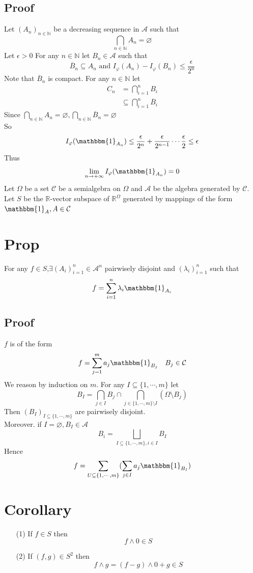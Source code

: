 \documentclass{book}
\begin{document}
\subsection*{Proof}
Let $(A_n)_{n\in \mathbb{N}}$ be a decreasing sequence in $\mathcal{A}$ such that$$\bigcap\limits_{n\in \mathbb{N}}A_n=\varnothing$$
Let $\epsilon>0$ For any $n\in \mathbb{N}$ let $B_n\in \mathcal{A}$ such that $$\overline{B}_n\subseteq A_n\text{ and }I_\varphi(A_n)-I_\varphi(B_n)\leq\frac{\epsilon}{2^n}$$
Note that $\overline{B}_n$ is compact. For any $n\in \mathbb{N}$ let
$$\begin{aligned}
    C_n &= \bigcap\limits_{i=1}^n B_i\\
    &\subseteq \bigcap\limits_{i=1}^n \overline{B}_i
\end{aligned}$$
Since $\bigcap\limits_{n\in \mathbb{N}}A_n=\varnothing,\bigcap\limits_{n\in \mathbb{N}}\overline{B}_n=\varnothing$\\
So $$I_\varphi(\mathbbm{1}_{A_n})\leq\frac{\epsilon}{2^n}+\frac{\epsilon}{2^{n-1}}\cdots\frac{\epsilon}2\leq\epsilon$$
Thus$$\lim\limits_{n\rightarrow+\infty}I_\varphi(\mathbbm{1}_{A_n})=0$$
Let $\Omega$ be a set $\mathcal{C}$ be a semialgebra on $\Omega$ and $\mathcal{A}$ be the algebra generated by $\mathcal{C}$. Let $S$ be the $\mathbb{R}$-vector subspace of $\mathbb{R}^\Omega$ generated by mappings of the form $\mathbbm{1}_A,A\in \mathcal{C}$
\section{Prop}For any $f\in S$,$\exists (A_i)_{i=1}^n\in\mathcal{A}^n$ pairwisely disjoint and $(\lambda_i)_{i=1}^n$ such that $$f=\sum\limits_{i=1}^n\lambda_i\mathbbm{1}_{A_i}$$
\subsection*{Proof}
$f$ is of the form $$f=\sum\limits_{j=1}^m a_j\mathbbm{1}_{B_j}\quad B_j\in \mathcal{C}$$We reason by induction on $m$. For any $I\subseteq\{1,\cdots,m\}$ let 
$$B_I=\bigcap\limits_{j\in I}B_j\cap\bigcap\limits_{j\in \{1,\cdots,m\}\setminus I}(\Omega\setminus B_j)$$ Then $(B_I)_{I\subseteq\{1,\cdots,m\}}$ are pairwisely disjoint.\\
Moreover. if $I=\varnothing, B_I\in \mathcal{A}$$$B_i=\bigsqcup\limits_{I\subseteq\{1,\cdots,m\},i\in I}B_I$$
Hence$$f=\sum\limits_{U\subseteq\{1,\cdots,m\}}(\sum\limits_{j\in I}a_j\mathbbm{1}_{B_I})$$
\section{Corollary}
\begin{itemize}
    \item [(1)] If $f\in S$ then $$f\wedge 0\in S$$
    \item [(2)] If $(f,g)\in S^2$ then $$f\wedge g=(f-g)\wedge0+g\in S$$
\end{itemize}
\end{document}
